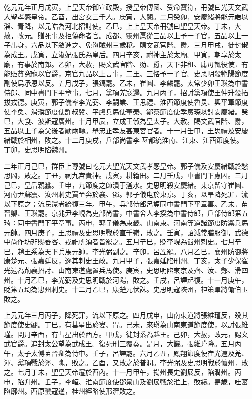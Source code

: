 \begin{pinyinscope}
 乾元元年正月戊寅，上皇天帝御宣政殿，授皇帝傳國、受命寶符，冊號曰光天文武大聖孝感皇帝。乙酉，出宮女三千人。庚寅，大閱。二月癸卯，安慶緒將能元皓以淄、青降，以元皓為河北招討使。乙巳，上上皇天帝冊號曰聖皇天帝。丁未，大赦，改元。贈死事及拒偽命者官。成都、靈州扈從三品以上予一子官，五品以上一子出身，六品以下敘進之。免陷賊州三歲稅。賜文武官階、爵。三月甲戌，徙封俶為成王。戊寅，立淑妃張氏為皇后。四月辛亥，祔神主於太廟。甲寅，朝享於太廟，有事於南郊。乙卯，大赦，賜文武官階、勛、爵，天下非租、庸毋輒役使，有能賑貧究寵以官爵，京官九品以上言事，二王、三恪予一子官。史思明殺範陽節度副使烏承恩以反。五月戊子，張鎬罷。乙未，崔圓、李麟罷。太常少卯王璵為中書侍郎、同中書門下平章事。七月，黨項羌寇邊。九月丙子，招討黨項使王仲升殺拓拔戎德。庚寅，郭子儀率李光弼、李嗣業、王思禮、淮西節度使魯炅、興平軍節度使李奐、滑濮節度使許叔冀、平盧兵馬使董秦、鄭蔡節度使季廣琛以討安慶緒。癸巳，大食、波斯寇廣州。十月甲辰，立成王俶為皇太子。大赦。賜文武官階、爵，五品以上子為父後者勛兩轉。舉忠正孝友甚東宮官者。十一月壬申，王思禮及安慶緒戰於相州，敗之。十二月庚戌，戶部尚書李亙都統淮南、江東、江酉節度使。丁卯，史思明陷魏州。



 二年正月己巳，群臣上尊號曰乾元大聖光天文武孝感皇帝。郭子儀及安慶緒戰於愁思岡，敗之。丁丑，祠九宮貴神。戊寅，耕籍田。二月壬戌，中書門下慮囚。三月己巳，皇后親蠶。壬申，九節度之師潰于滏水。史思明殺安慶緒。東京留守崔圓、河南尹蘇震、汝州刺史賈至奔於襄、鄧。郭子儀屯於東京。丁亥，以旱降死罪，流以下原之；流民還者給復三年。甲午，兵部侍郎呂諲同中書門下平章事。乙未，苗晉卿、王璵罷。京兆尹李峴為吏部尚書，中書舍人李揆為中書侍郎，戶部侍郎第五琦：同中書門下平章事。丙申，郭子儀為東畿、山南東、河南等道諸節度防禦兵馬元帥。四月庚子，王思禮及史思明戰於直千嶺，敗之。壬寅，詔減常膳服御，武德中尚作坊非賜蕃客、戎祀所須者皆罷之。五月辛巳，貶李峴為蜀州刺史。七月辛巳，趙王系為天下兵馬元帥，李光弼副之。辛卯，呂諲罷。八月乙巳，襄州防御將康楚元、張嘉廷反，逐其刺史王政。九月甲子，張嘉延陷刑州。丁亥，太子少保崔光遠為荊襄招討、山南東道處置兵馬使。庚寅，史思明陷東京及齊、汝、鄭、滑四州。十月乙巳，李光弼及史思明戰於河陽，敗之。壬戌，呂諲起復。十一月庚午，貶第五琦為忠州刺史。十二月乙巳，康楚元伏誅。史思明寇陜州，神策軍將衛伯玉敗之。



 上元元年三月丙子，降死罪，流以下原之。四月戊申，山南東道將張維瑾反，殺其節度使史翽。丁巳，有彗星出於婁、胃。己未，來瑱為山南東道節度使，以討張維瑾。閏月辛酉，有彗星出於西方。甲戌，徙封系為越王。己卯，大赦，改元，賜文武官爵。追封太公望為武成王。復死刑三覆奏。是月，大饑。張維瑾降。五月丙午，太子太傅苗晉卿為侍中。壬子，呂諲罷。六月乙丑，鳳翔節度使崔光遠及羌、渾、黨項戰於涇、隴，敗之。乙酉，又敗之於普潤。李光弼及史思明戰於懷州，敗之。七月丁未，聖皇天帝遷於西內。十一月甲午，揚州長史劉展反，陷潤州。丙申，陷升州。壬子，李峘、淮南節度使鄧景山及劉展戰於淮上，敗績。是歲，吐蕃陷廓州。西原蠻寇邊，桂州經略使邢濟敗之。




\end{pinyinscope}
